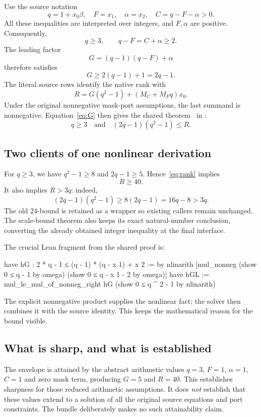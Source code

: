 \documentclass[11pt,a4paper]{article}
\newcommand{\code}[1]{\texttt{\detokenize{#1}}}
\begin{document}
Use the source notation
\[
 q=1+x_0\beta,\quad F=x_1,\quad \alpha=x_2,\quad
 C=q-F-\alpha>0.
\]
All these inequalities are interpreted over integers, and $F,\alpha$ are positive. Consequently,
\[
  q\ge3,\qquad q-F=C+\alpha\ge2.
\]
The leading factor
\[
  G=(q-1)(q-F)+\alpha
\]
therefore satisfies
\begin{equation}
  G\ge2(q-1)+1=2q-1.
  \label{eq:G}
\end{equation}
The literal source rows identify the native rank with
\[
  R=G(q^2-1)+(M_C+M_Fq)x_0.
\]
Under the original nonnegative mask-port assumptions, the last summand is nonnegative. Equation~\eqref{eq:G} then gives the shared theorem \  in \code{NativePellBootstrap}:
\begin{equation}
  q\ge3\quad\text{and}\quad (2q-1)(q^2-1)\le R.
  \label{eq:rank}
\end{equation}

\subsection{Two clients of one nonlinear derivation}

For $q\ge3$, we have $q^2-1\ge8$ and $2q-1\ge5$. Hence~\eqref{eq:rank} implies
\[
  R\ge40.
\]
It also implies $R>3q$: indeed,
\[
  (2q-1)(q^2-1)\ge8(2q-1)=16q-8>3q.
\]
The old 24-bound is retained as a wrapper so existing callers remain unchanged. The scale-bound theorem also keeps its exact natural-number conclusion, converting the already obtained integer inequality at the final interface.

The crucial Lean fragment from the shared proof is:
\begin{Lean}
have hG : 2 * q - 1 ≤ (q - 1) * (q - x 1) + x 2 := by
  nlinarith [mul_nonneg (show 0 ≤ q - 1 by omega)
    (show 0 ≤ q - x 1 - 2 by omega)]
have hGL := mul_le_mul_of_nonneg_right hG
  (show 0 ≤ q ^ 2 - 1 by nlinarith)
\end{Lean}
The explicit nonnegative product supplies the nonlinear fact; the solver then combines it with the source identity. This keeps the mathematical reason for the bound visible.

\subsection{What is sharp, and what is established}

The envelope is attained by the abstract arithmetic values $q=3$, $F=1$, $\alpha=1$, $C=1$ and zero mask term, producing $G=5$ and $R=40$. This establishes sharpness for those reduced arithmetic assumptions. It does \emph{not} establish that these values extend to a solution of all the original source equations and port constraints. The bundle deliberately makes no such attainability claim.
\end{document}
